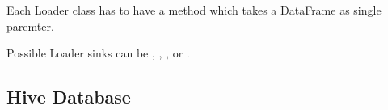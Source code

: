 \documentclass[a4paper,10pt, twoside,english]{sphinxmanual}
\begin{document}
Each Loader class has to have a  method which takes a DataFrame as single paremter.

Possible Loader sinks can be , , ,  or .


\subsection{Hive Database}
\label{\detokenize{loader/hive_loader:module-spooq2.loader.hive_loader}}\label{\detokenize{loader/hive_loader:hive-database}}\label{\detokenize{loader/hive_loader::doc}}
\end{document}
